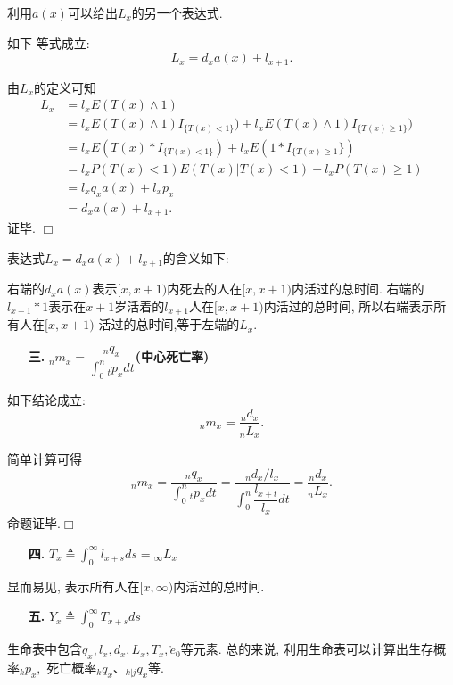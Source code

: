 \documentclass[a4paper,10pt]{ctexbook}
\newcommand{\hei}{\CJKfamily{hei}}      %
\def\qed{\hfill$\Box$\medskip}
\begin{document}
利用$a(x)$可以给出$L_x$的另一个表达式.
\begin{proposition}如下
    等式成立: $$L_x=d_xa(x)+l_{x+1}.$$
\end{proposition}
\proof 由$L_x$的定义可知
\begin{align*}
    L_x & =l_xE(T(x)\wedge1)                                                     \\
        & =l_xE(T(x)\wedge1)I_{\{T(x)<1\}})+l_xE(T(x)\wedge 1)I_{\{T(x)\ge 1\}}) \\
        & =l_xE(T(x)*I_{\{T(x)<1\}})+l_xE(1*I_{\{T(x)\ge 1}\})                   \\
        & =l_xP(T(x)<1)E(T(x)|T(x)<1)+l_xP(T(x)\ge 1)                            \\
        & =l_xq_xa(x)+l_xp_x                                                     \\
        & =d_xa(x)+l_{x+1}.
\end{align*}
证毕. \qed

表达式$L_x=d_xa(x)+l_{x+1}$的含义如下:

\noindent 右端的$d_xa(x)$表示$[x,x+1)$内死去的人在$[x,x+1)$内活过的总时间. 右端的$l_{x+1}*1$表示在$x+1$岁活着的$l_{x+1}$人在$[x,x+1)$内活过的总时间, 所以右端表示所有人在$[x,x+1)$ 活过的总时间,等于左端的$L_x.$
\begin{itemize}
    \item[{\bf\hei 三.}]{\bf\hei ${}_nm_x=\dfrac {{}_nq_x}{\int_0^n{}_tp_xdt}$(中心死亡率)}
\end{itemize}


\begin{proposition}如下结论成立:
    $${}_nm_x=\dfrac{{}_nd_x}{{}_nL_x}.$$
\end{proposition}
\proof 简单计算可得
$${}_nm_x=\dfrac{{}_nq_x}{\int_0^n{}_tp_xdt}=\dfrac{{}_nd_x/l_x}{\int_0^n\dfrac{l_{x+t}}{l_x}dt}=
    \dfrac{{}_nd_x}{{}_nL_x}.$$命题证毕.\qed

\begin{itemize}
    \item[{\bf\hei 四.}]{\bf\hei $T_x\triangleq\int_0^{\infty}l_{x+s}ds={}_{\infty}L_x$}
\end{itemize}
显而易见, 表示所有人在$[x,\infty)$内活过的总时间.

\begin{itemize}
    \item[{\bf\hei 五.}]{\bf\hei $Y_x\triangleq\int_0^{\infty}T_{x+s}ds$}
\end{itemize}

生命表中包含$q_x,l_x,d_x,L_x,T_x,\mathring{e}_0$等元素. 总的来说, 利用生命表可以计算出生存概率${}_kp_x,$ 死亡概率${}_kq_x$、${}_{k|j}q_x$等.
\newpage
\end{document}
